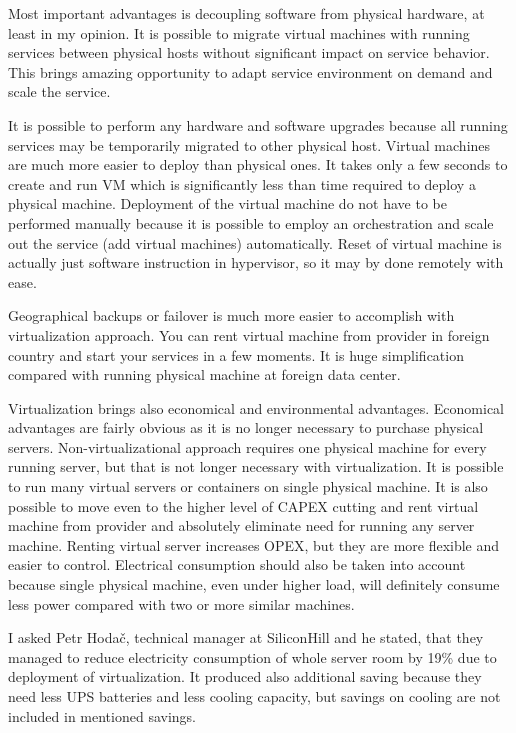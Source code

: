 
Most important advantages is decoupling software from physical hardware, at least in my opinion. It is possible to migrate virtual machines with running services between physical hosts without significant impact on service behavior. This brings amazing opportunity to adapt service environment on demand and scale the service.

It is possible to perform any hardware and software upgrades because all running services may be temporarily migrated to other physical host. Virtual machines are much more easier to deploy than physical ones. It takes only a few seconds to create and run \Ac{VM} which is significantly less than time required to deploy a physical machine. Deployment of the virtual machine do not have to be performed manually because it is possible to employ an orchestration and scale out the service (add virtual machines) automatically.
Reset of virtual machine is actually just software instruction in hypervisor, so it may by done remotely with ease.

Geographical backups or failover is much more easier to accomplish with virtualization approach. You can rent virtual machine from provider in foreign country and start your services in a few moments. It is huge simplification compared with running physical machine at foreign data center.

Virtualization brings also economical and environmental advantages. Economical advantages are fairly obvious as it is no longer necessary to purchase physical servers. Non-virtualizational approach requires one physical machine for every running server, but that is not longer necessary with virtualization. It is possible to run many virtual servers or containers on single physical machine. It is also possible to move even to the higher level of \Ac{CAPEX} cutting and rent virtual machine from provider and absolutely eliminate need for running any server machine. Renting virtual server increases \Ac{OPEX}, but they are more flexible and easier to control.
Electrical consumption should also be taken into account because single physical machine, even under higher load, will definitely consume less power compared with two or more similar machines.

I asked Petr Hodač, technical manager at SiliconHill and he stated, that they managed to reduce electricity consumption of whole server room by 19\%  due to deployment of virtualization. It produced also additional saving because they need less \Ac{UPS} batteries and less cooling capacity, but savings on cooling are not included in mentioned savings.

